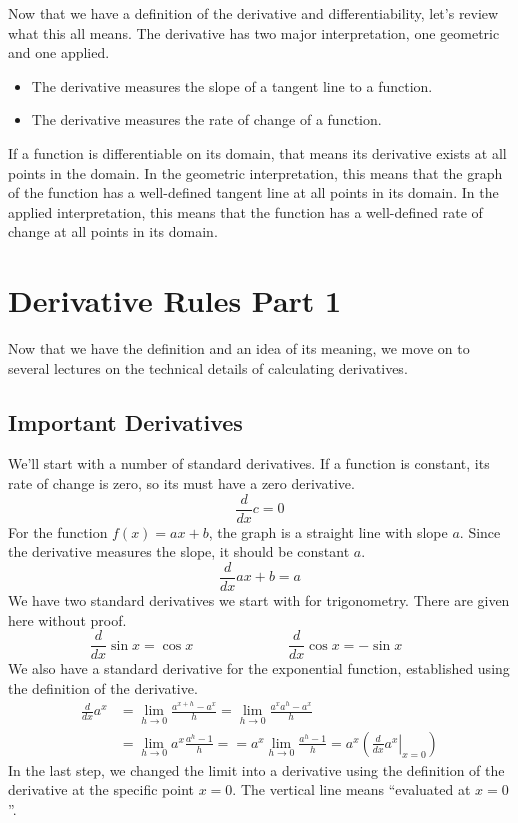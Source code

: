\documentclass[fleqn]{report}
\begin{document}
Now that we have a definition of the derivative and
differentiability, let's review what this all means. The
derivative has two major interpretation, one geometric and one
applied. 
\begin{itemize}
\item The derivative measures the slope of a tangent line to a
function.
\item The derivative measures the rate of change of a function.
\end{itemize}
If a function is differentiable on its domain, that means its
derivative exists at all points in the domain. In the
geometric interpretation, this means that the graph of the
function has a well-defined tangent line at all points in its
domain. In the applied interpretation, this means that the
function has a well-defined rate of change at all points in
its domain.

\chapter{Derivative Rules Part 1}
\label{Derivative Rules Part 1}

Now that we have the definition and an idea of its meaning, we
move on to several lectures on the technical details of
calculating derivatives. 

\section*{Important Derivatives}

We'll start with a number of standard derivatives. If a
function is constant, its rate of change is zero, so its must
have a zero derivative. 
\begin{equation*}
\frac{d}{dx} c = 0
\end{equation*}
For the function $f(x) = ax + b$, the graph is a straight line
with slope $a$. Since the derivative measures the slope, it
should be constant $a$.
\begin{equation*}
\frac{d}{dx} ax + b = a
\end{equation*}
We have two standard derivatives we start with for
trigonometry. There are given here without proof.
\begin{equation*}
\frac{d}{dx} \sin x = \cos x \quad \quad \hspace{2cm}
\frac{d}{dx} \cos x = -\sin x \quad \quad 
\end{equation*}
We also have a standard derivative for the exponential
function, established  using the definition of the
derivative.
\begin{align*}
\frac{d}{dx} a^x & = \lim_{h \rightarrow 0} \frac{a^{x+h} -
a^x}{h} = \lim_{h \rightarrow 0} \frac{a^x a^h - a^x}{h} \\
& = \lim_{h \rightarrow 0} a^x \frac{a^h-1}{h} = 
= a^x \lim_{h \rightarrow 0} \frac{a^h-1}{h} = 
a^x \left( \left. \frac{d}{dx} a^x \right|_{x=0} \right) 
\end{align*}
In the last step, we changed the limit into a derivative using
the definition of the derivative at the specific point $x=0$.
The vertical line means ``evaluated at $x=0$''. 
\end{document}
